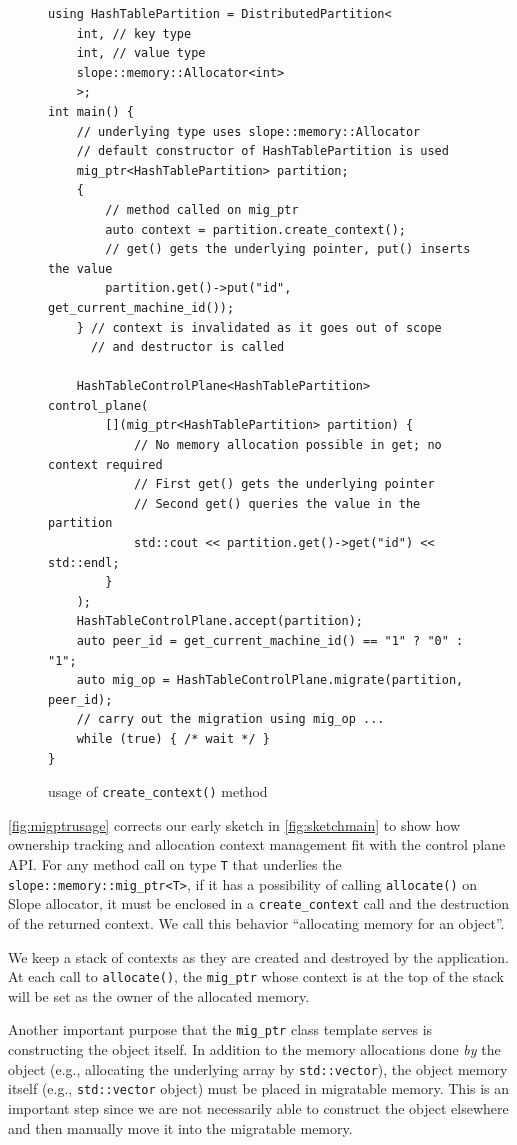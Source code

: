 \begin{figure}[tp]
\begin{lstlisting}
using HashTablePartition = DistributedPartition<
    int, // key type
    int, // value type
    slope::memory::Allocator<int>
    >;
int main() {
    // underlying type uses slope::memory::Allocator
    // default constructor of HashTablePartition is used
    mig_ptr<HashTablePartition> partition;
    {
        // method called on mig_ptr
        auto context = partition.create_context();
        // get() gets the underlying pointer, put() inserts the value
        partition.get()->put("id", get_current_machine_id());
    } // context is invalidated as it goes out of scope
      // and destructor is called

    HashTableControlPlane<HashTablePartition> control_plane(
        [](mig_ptr<HashTablePartition> partition) {
            // No memory allocation possible in get; no context required
            // First get() gets the underlying pointer
            // Second get() queries the value in the partition
            std::cout << partition.get()->get("id") << std::endl;
        }
    );
    HashTableControlPlane.accept(partition);
    auto peer_id = get_current_machine_id() == "1" ? "0" : "1";
    auto mig_op = HashTableControlPlane.migrate(partition, peer_id);
    // carry out the migration using mig_op ...
    while (true) { /* wait */ }
}
\end{lstlisting}
\caption{
    usage of \texttt{create\_context()} method
}
\label{fig:migptrusage}
\end{figure}

\autoref{fig:migptrusage} corrects our early sketch in \autoref{fig:sketchmain}
to show how
ownership tracking and allocation context management fit with the control plane
API. For any method call
on type \texttt{T} that underlies the \texttt{slope::memory::mig\_ptr<T>},
if it has a possibility of calling \texttt{allocate()} on Slope allocator, it
must be enclosed in a \texttt{create\_context} call and the destruction of the
returned context. We call this behavior ``allocating memory for
an object''.

We keep a stack of contexts as they are created and destroyed by the application.
At each call to \texttt{allocate()}, the \texttt{mig\_ptr} whose context is at
the top of the stack will be set as the owner of the allocated memory.

Another important purpose that the \texttt{mig\_ptr} class template serves is
constructing the object itself. In addition to the memory allocations done
\emph{by} the object (e.g., allocating the underlying array by \texttt{std::vector}),
the object memory itself (e.g., \texttt{std::vector} object) must be placed in
migratable memory. This is an important step since we are not necessarily able
to construct the object elsewhere and then manually move it into the migratable
memory.


